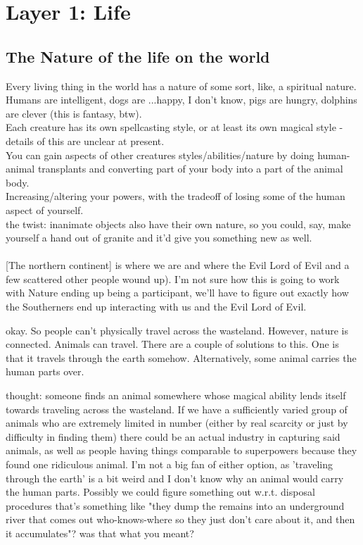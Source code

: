 \chapter*{Layer 1: Life} \section*{The Nature of the life on the world}

\R Every living thing in the world has a nature of some sort, like, a spiritual
nature.  Humans are intelligent, dogs are ...happy, I don't know, pigs are
hungry, dolphins are clever (this is fantasy, btw). \\ Each creature has its own
spellcasting style, or at least its own magical style - details of this are
unclear at present. \\ You can gain aspects of other creatures
styles/abilities/nature by doing human-animal transplants and converting part of
your body into a part of the animal body. \\ Increasing/altering your powers,
with the tradeoff of losing some of the human aspect of yourself. \\ the twist:
inanimate objects also have their own nature, so you could, say, make yourself a
hand out of granite and it'd give you something new as well. \\ \\

[The northern continent]  is where we are and where the Evil Lord of Evil and a
few scattered other people wound up).  I'm not sure how this is going to work
with Nature ending up being a participant, we'll have to figure out exactly how
the Southerners end up interacting with us and the Evil Lord of Evil. 

\A okay. So people can’t physically travel across the wasteland. However, nature
is connected. Animals can travel. There are a couple of solutions to this. One
is that it travels through the earth somehow. Alternatively, some animal carries
the human parts over.

\R thought: someone finds an animal somewhere whose magical ability lends itself
towards traveling across the wasteland.  If we have a sufficiently varied group
of animals who are extremely limited in number (either by real scarcity or just
by difficulty in finding them) there could be an actual industry in capturing
said animals, as well as people having things comparable to superpowers because
they found one ridiculous animal.  I'm not a big fan of either option, as
'traveling through the earth' is a bit weird and I don't know why an animal
would carry the human parts.  Possibly we could figure something out w.r.t.
disposal procedures that's something like "they dump the remains into an
underground river that comes out who-knows-where so they just don't care about
it, and then it accumulates"?  was that what you meant? \\\\


